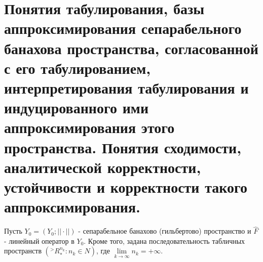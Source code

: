 


\section{Понятия табулирования, базы аппроксимирования сепарабельного банахова пространства, согласованной с его табулированием, интерпретирования табулирования и индуцированного ими аппроксимирования этого пространства. Понятия сходимости, аналитической корректности, устойчивости и корректности такого аппроксимирования.}

Пусть $Y_0 = \left(Y_0; ||\cdot||\right)$ - сепарабельное банахово (гильбертово) пространство и $\hat{F}$ - линейный оператор в $Y_0$. Кроме того, задана последовательность табличных пространств $\left(^>R^{n_k}_{*}:n_k\in N\right)$, где $\lim\limits_{k\to \infty}n_k = +\infty$.
